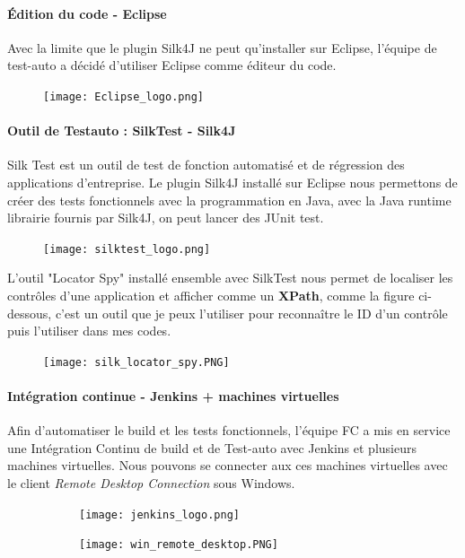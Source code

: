     \paragraph{Édition du code - Eclipse}
    Avec la limite que le plugin Silk4J ne peut qu'installer sur Eclipse, l'équipe de test-auto a décidé d'utiliser Eclipse comme éditeur du code.
    \begin{figure}[H]
    	\flushleft
    	\texttt{[image: Eclipse\_logo.png]}
    	\label{fig:eclipse_logo}
    \end{figure}
    
    \paragraph{Outil de Testauto : SilkTest - Silk4J}
    \par Silk Test est un outil de test de fonction automatisé et de régression des applications d'entreprise. Le plugin Silk4J installé sur Eclipse nous permettons de créer des tests fonctionnels avec la programmation en Java, avec la Java runtime librairie fournis par Silk4J, on peut lancer des JUnit test.
    \begin{figure}[H]
    	\flushleft
    	\texttt{[image: silktest\_logo.png]}
    	\label{fig:silktest_logo}
    \end{figure}
    
    \par L'outil "Locator Spy" installé ensemble avec SilkTest nous permet de localiser les contrôles d'une application et afficher comme un \textbf{XPath}, comme la figure ci-dessous, c'est un outil que je peux l'utiliser pour reconnaître le ID d'un contrôle puis l'utiliser dans mes codes.
    \begin{figure}[H]
    	\flushleft
    	\texttt{[image: silk\_locator\_spy.PNG]}
    	\label{fig:silk_locator_spy_label}
    \end{figure}
    
    \paragraph{Intégration continue - Jenkins + machines virtuelles}
    Afin d'automatiser le build et les tests fonctionnels, l'équipe FC a mis en service une Intégration Continu de build et de Test-auto avec Jenkins et plusieurs machines virtuelles. Nous pouvons se connecter aux ces machines virtuelles avec le client \textit{Remote Desktop Connection} sous Windows.
    \begin{figure}[H]
    	\flushleft 
    	\begin{subfigure}[b]{.45\textwidth}
    		\texttt{[image: jenkins\_logo.png]}
    	\end{subfigure}
    	\begin{subfigure}[b]{.45\textwidth}
    		\texttt{[image: win\_remote\_desktop.PNG]}
    	\end{subfigure}
    	\label{jenksin_+_win_remote_desktop_label}
    \end{figure}
    
